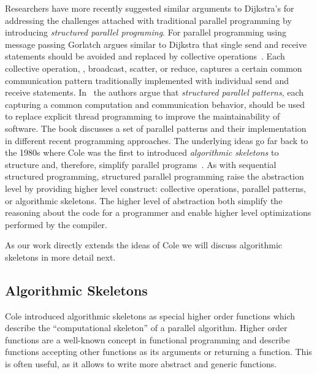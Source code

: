 Researchers have more recently suggested similar arguments to Dijkstra's for addressing the challenges attached with traditional parallel programming by introducing \emph{structured parallel programing}.
For parallel programming using message passing Gorlatch argues similar to Dijkstra that single send and receive statements should be avoided and replaced by collective operations~\cite{Gorlatch04}.
Each collective operation, \eg, broadcast, scatter, or reduce, captures a certain common communication pattern traditionally implemented with individual send and receive statements.
In~\cite{McCoolRoRe2012} the authors argue that \emph{structured parallel patterns}, each capturing a common computation and communication behavior, should be used to replace explicit thread programming to improve the maintainability of software.
The book discusses a set of parallel patterns and their implementation in different recent programming approaches.
The underlying ideas go far back to the 1980s where Cole was the first to introduced \emph{algorithmic skeletons} to structure and, therefore, simplify parallel programs~\cite{Cole1991}.
As with sequential structured programming, structured parallel programming raise the abstraction level by providing higher level construct: collective operations, parallel patterns, or algorithmic skeletons.
The higher level of abstraction both simplify the reasoning about the code for a programmer and enable higher level optimizations performed by the compiler.

As our work directly extends the ideas of Cole we will discuss algorithmic skeletons in more detail next.

\subsection{Algorithmic Skeletons}
Cole introduced algorithmic skeletons as special higher order functions which describe the ``computational skeleton'' of a parallel algorithm.
Higher order functions are a well-known concept in functional programming and describe functions accepting other functions as its arguments or returning a function.
This is often useful, as it allows to write more abstract and generic functions.

